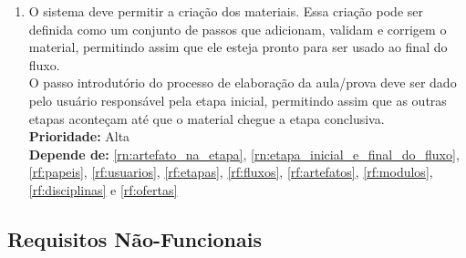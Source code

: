 \begin{enumerate}[label=\textbf{RF\protect\twodigits{\theenumi}}, leftmargin=2cm]
	\item \label{rf:fluxo} O sistema deve permitir a criação dos materiais. Essa criação pode ser definida como um conjunto de passos que adicionam, validam e corrigem o material, permitindo assim que ele esteja pronto para ser usado ao final do fluxo. \\
	O passo introdutório do processo de elaboração da aula/prova deve ser dado pelo usuário responsável pela etapa inicial, permitindo assim que as outras etapas aconteçam até que o material chegue a etapa conclusiva. \\	
	\textbf{Prioridade:} Alta \\
	\textbf{Depende de:} \hyperref[rn:artefato_na_etapa]{\ref{rn:artefato_na_etapa}}, \hyperref[rn:etapa_inicial_e_final_do_fluxo]{\ref{rn:etapa_inicial_e_final_do_fluxo}}, \hyperref[rf:papeis]{\ref{rf:papeis}}, \hyperref[rf:usuarios]{\ref{rf:usuarios}}, \hyperref[rf:etapas]{\ref{rf:etapas}}, \hyperref[rf:fluxos]{\ref{rf:fluxos}}, \hyperref[rf:artefatos]{\ref{rf:artefatos}}, \hyperref[rf:modulos]{\ref{rf:modulos}}, \hyperref[rf:disciplinas]{\ref{rf:disciplinas}} e \hyperref[rf:ofertas]{\ref{rf:ofertas}}
	
\end{enumerate}

\subsection{Requisitos Não-Funcionais}

